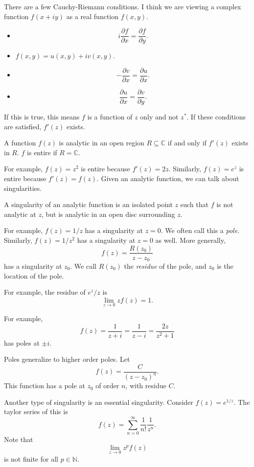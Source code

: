 There are a few Cauchy-Riemann conditions. I think we are viewing a complex function $f(x+iy)$ as a real function $f(x,y)$.
\begin{itemize}
	\item
		\[
			i \frac{\partial f}{\partial x} =\frac{\partial f}{\partial y} 
		.\]
	\item $f(x,y)=u(x,y)+iv(x,y)$.
	\item 
		\[
			-\frac{\partial v}{\partial x} =\frac{\partial u}{\partial x} 
		.\]
	\item 
		\[
			\frac{\partial u}{\partial x} =\frac{\partial v}{\partial y} 
		.\]
\end{itemize}
If this is true, this means $f$ is a function of $z$ only and not $z^*$. If these conditions are satisfied, $f'(z)$ exists.
\begin{definition}[Analytic]\label{dfn:1.1}
	A function $f(z)$ is analytic in an open region $R\subseteq \mathbb{C} $ if and only if $f'(z)$ exists in $R$. $f$ is entire if $R=\mathbb{C} $.
\end{definition}

For example, $f(z)=z^2$ is entire because $f'(z)=2z$. Similarly, $f(z)=e^z$ is entire because $f'(z)=f(z)$. Given an analytic function, we can talk about singularities.
\begin{definition}[Singularity]\label{dfn:1.2}
	A singularity of an analytic function is an isolated point $z$ such that $f$ is not analytic at $z$, but is analytic in an open disc surrounding $z$.
\end{definition}

For example, $f(z)=1/z$ has a singularity at $z=0$. We often call this a \emph{pole}. Similarly, $f(z)=1/z^2$ has a singularity at $z=0$ as well. More generally,
\[
	f(z)=\frac{R(z_0)}{z-z_0} 
\]
has a singularity at $z_0$. We call $R(z_0)$ the \emph{residue} of the pole, and $z_0$ is the location of the pole.

For example, the residue of $e^z/z$ is
\[
	\lim_{z \to 0} zf(z)=1
.\]

For example,
\[
	f(z)=\frac{1}{z+i} =\frac{1}{z-i} =\frac{2z}{z^2+1} 
\]
has poles at $\pm i$.

Poles generalize to higher order poles. Let
\[
	f(z)=\frac{C}{\left( z-z_0 \right) ^n} 
.\]
This function has a pole at $z_0$ of order $n$, with residue $C$.

Another type of singularity is an essential singularity. Consider $f(z)=e^{1/z} $. The taylor series of this is
\[
	f(z)=\sum_{n=0}^{\infty} \frac{1}{n!} \frac{1}{z^n} 
.\]
Note that
\[
	\lim_{z \to 0} z^p f(z)
\]
is not finite for all $p\in\mathbb{N} $.

